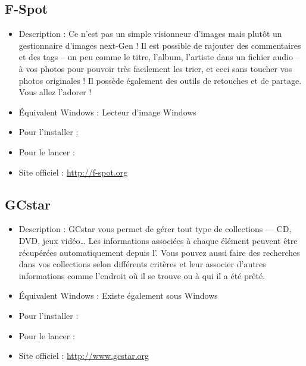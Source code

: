 \subsection{F-Spot}
\label{RefF-Spot}
\begin{itemize}
\begingroup
{}
\item Description : Ce n'est pas un simple visionneur d'images mais plutôt un gestionnaire d'images next-Gen ! Il est possible de rajouter des commentaires et des tags -- un peu comme le titre, l'album, l'artiste dans un fichier audio -- à vos photos pour pouvoir très facilement les trier, et ceci sans toucher vos photos originales ! Il possède également des outils de retouches et de partage. Vous allez l'adorer !{\par}
\item Équivalent Windows : Lecteur d'image Windows{\par}
\item Pour l'installer : 
\item Pour le lancer : 
\item Site officiel : \url{http://f-spot.org}{\par}
\endgroup
\end{itemize}

\subsection{GCstar}
\begin{itemize}
\begingroup
{}
\item Description : GCstar vous permet de gérer tout type de collections --- CD, DVD, jeux vidéo\ldots{} Les informations associées à chaque élément peuvent être récupérées automatiquement depuis l'. Vous pouvez aussi faire des recherches dans vos collections selon différents critères et leur associer d'autres informations comme l'endroit où il se trouve ou à qui il a été prêté.{\par}
\item Équivalent Windows : Existe également sous Windows{\par}
\item Pour l'installer : 
\item Pour le lancer : 
\item Site officiel : \url{http://www.gcstar.org}{\par}
\endgroup
\end{itemize}

